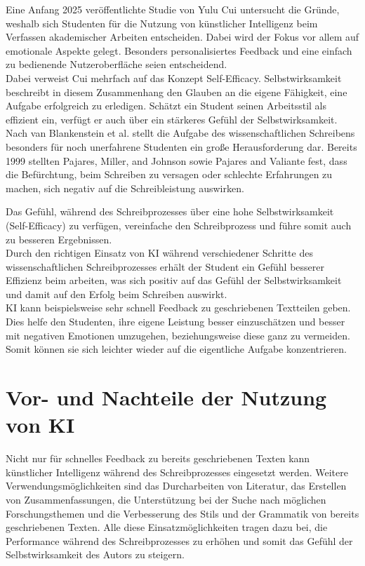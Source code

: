 \documentclass[../main.tex]{subfiles}
\begin{document}
Eine Anfang 2025 veröffentlichte Studie von Yulu Cui untersucht die Gründe, weshalb sich Studenten für die Nutzung von 
künstlicher Intelligenz beim Verfassen akademischer Arbeiten entscheiden. Dabei wird der Fokus vor allem auf emotionale 
Aspekte gelegt. Besonders personalisiertes Feedback und eine einfach zu bedienende Nutzeroberfläche seien entscheidend.\cite{SelfEfficacyBeliefs} \\
Dabei verweist Cui mehrfach auf das Konzept Self-Efficacy. Selbstwirksamkeit beschreibt in diesem Zusammenhang den Glauben 
an die eigene Fähigkeit, eine Aufgabe erfolgreich zu erledigen. Schätzt ein Student seinen Arbeitsstil als effizient ein, 
verfügt er auch über ein stärkeres Gefühl der Selbstwirksamkeit.\\
Nach van Blankenstein et al. stellt die Aufgabe des wissenschaftlichen Schreibens besonders für noch unerfahrene Studenten 
ein große Herausforderung dar. Bereits 1999 stellten Pajares, Miller, and Johnson sowie Pajares and Valiante fest,
dass die Befürchtung, beim Schreiben zu versagen oder schlechte Erfahrungen zu machen, sich negativ auf die Schreibleistung 
auswirken.\cite{writingSelfBeliefs,writingSelfBeliefsMiddleSchool}

Das Gefühl, während des Schreibprozesses über eine hohe Selbstwirksamkeit (Self-Efficacy) zu verfügen, vereinfache den 
Schreibprozess und führe somit auch zu besseren Ergebnissen.\cite{SelfEfficacyBeliefs} \\
Durch den richtigen Einsatz von KI während verschiedener Schritte des wissenschaftlichen Schreibprozesses erhält der Student
ein Gefühl besserer Effizienz beim arbeiten, was sich positiv auf das Gefühl der Selbstwirksamkeit und damit auf den Erfolg
beim Schreiben auswirkt.\\
KI kann beispielsweise sehr schnell Feedback zu geschriebenen Textteilen geben. Dies helfe den Studenten, ihre eigene 
Leistung besser einzuschätzen und besser mit negativen Emotionen umzugehen, beziehungsweise diese ganz zu vermeiden. Somit 
können sie sich leichter wieder auf die eigentliche Aufgabe konzentrieren.\cite{SelfEfficacyBeliefs} 



\section{Vor- und Nachteile der Nutzung von KI}

Nicht nur für schnelles Feedback zu bereits geschriebenen Texten kann künstlicher Intelligenz während des Schreibprozesses eingesetzt werden. 
Weitere Verwendungsmöglichkeiten sind das Durcharbeiten von Literatur, das Erstellen von Zusammenfassungen, die Unterstützung bei der Suche nach 
möglichen Forschungsthemen und die Verbesserung des Stils und der Grammatik von bereits geschriebenen Texten. Alle diese Einsatzmöglichkeiten 
tragen dazu bei, die Performance während des Schreibprozesses zu erhöhen und somit das Gefühl der Selbstwirksamkeit des Autors zu steigern.\cite{SelfEfficacyBeliefs}
\end{document}
